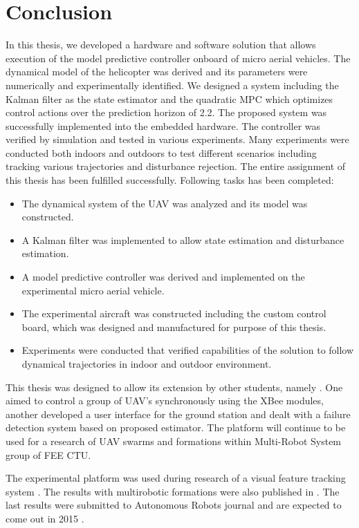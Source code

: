\section{Conclusion}

In this thesis, we developed a hardware and software solution that allows execution of the model predictive controller onboard of micro aerial vehicles. The dynamical model of the helicopter was derived and its parameters were numerically and experimentally identified. We designed a system including the Kalman filter as the state estimator and the quadratic MPC which optimizes control actions over the prediction horizon of 2.2. The proposed system was successfully implemented into the embedded hardware. The controller was verified by simulation and tested in various experiments. Many experiments were conducted both indoors and outdoors to test different scenarios including tracking various trajectories and disturbance rejection. The entire assignment of this thesis has been fulfilled successfully. Following tasks has been completed:

\begin{itemize}
\item The dynamical system of the UAV was analyzed and its model was constructed.
\item A Kalman filter was implemented to allow state estimation and disturbance estimation.
\item A model predictive controller was derived and implemented on the experimental micro aerial vehicle.
\item The experimental aircraft was constructed including the custom control board, which was designed and manufactured for purpose of this thesis.
\item Experiments were conducted that verified capabilities of the solution to follow dynamical trajectories in indoor and outdoor environment.
\end{itemize}

This thesis was designed to allow its extension by other students, namely \citep{klucka2015, fiedler2015}. One aimed to control a group of UAV's synchronously using the XBee modules, another developed a user interface for the ground station and dealt with a failure detection system based on proposed estimator. The platform will continue to be used for a research of UAV swarms and formations within Multi-Robot System group of FEE CTU.

The experimental platform was used during research of a visual feature tracking system \citep{chudoba2014surf}. The results with multirobotic formations were also published in \citep{saska_baca2014}. The last results were submitted to Autonomous Robots journal and are expected to come out in 2015 \citep{saska2015submitted}. 

